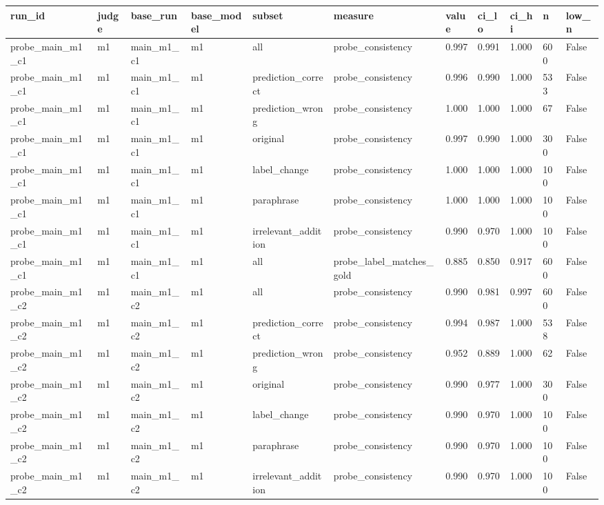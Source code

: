 \begin{tabular}{lllllllllll}
\toprule
run\_id & judge & base\_run & base\_model & subset & measure & value & ci\_lo & ci\_hi & n & low\_n \\
\midrule
probe\_main\_m1\_c1 & m1 & main\_m1\_c1 & m1 & all & probe\_consistency & 0.997 & 0.991 & 1.000 & 600 & False \\
probe\_main\_m1\_c1 & m1 & main\_m1\_c1 & m1 & prediction\_correct & probe\_consistency & 0.996 & 0.990 & 1.000 & 533 & False \\
probe\_main\_m1\_c1 & m1 & main\_m1\_c1 & m1 & prediction\_wrong & probe\_consistency & 1.000 & 1.000 & 1.000 & 67 & False \\
probe\_main\_m1\_c1 & m1 & main\_m1\_c1 & m1 & original & probe\_consistency & 0.997 & 0.990 & 1.000 & 300 & False \\
probe\_main\_m1\_c1 & m1 & main\_m1\_c1 & m1 & label\_change & probe\_consistency & 1.000 & 1.000 & 1.000 & 100 & False \\
probe\_main\_m1\_c1 & m1 & main\_m1\_c1 & m1 & paraphrase & probe\_consistency & 1.000 & 1.000 & 1.000 & 100 & False \\
probe\_main\_m1\_c1 & m1 & main\_m1\_c1 & m1 & irrelevant\_addition & probe\_consistency & 0.990 & 0.970 & 1.000 & 100 & False \\
probe\_main\_m1\_c1 & m1 & main\_m1\_c1 & m1 & all & probe\_label\_matches\_gold & 0.885 & 0.850 & 0.917 & 600 & False \\
probe\_main\_m1\_c2 & m1 & main\_m1\_c2 & m1 & all & probe\_consistency & 0.990 & 0.981 & 0.997 & 600 & False \\
probe\_main\_m1\_c2 & m1 & main\_m1\_c2 & m1 & prediction\_correct & probe\_consistency & 0.994 & 0.987 & 1.000 & 538 & False \\
probe\_main\_m1\_c2 & m1 & main\_m1\_c2 & m1 & prediction\_wrong & probe\_consistency & 0.952 & 0.889 & 1.000 & 62 & False \\
probe\_main\_m1\_c2 & m1 & main\_m1\_c2 & m1 & original & probe\_consistency & 0.990 & 0.977 & 1.000 & 300 & False \\
probe\_main\_m1\_c2 & m1 & main\_m1\_c2 & m1 & label\_change & probe\_consistency & 0.990 & 0.970 & 1.000 & 100 & False \\
probe\_main\_m1\_c2 & m1 & main\_m1\_c2 & m1 & paraphrase & probe\_consistency & 0.990 & 0.970 & 1.000 & 100 & False \\
probe\_main\_m1\_c2 & m1 & main\_m1\_c2 & m1 & irrelevant\_addition & probe\_consistency & 0.990 & 0.970 & 1.000 & 100 & False \\

\end{tabular}
